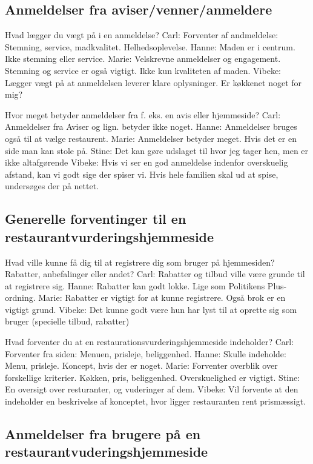 \documentclass[a4paper, 12pt]{article}
\begin{document}
\subsection{Anmeldelser fra aviser/venner/anmeldere}

  Hvad lægger du vægt på i en anmeldelse?
    Carl: Forventer af andmeldelse: Stemning, service, madkvalitet. Helhedsoplevelse.
    Hanne: Maden er i centrum. Ikke stemning eller service.
    Marie: Velskrevne anmeldelser og engagement. 
	   Stemning og service er også vigtigt. Ikke kun kvaliteten af maden.
    Vibeke: Lægger vægt på at anmeldelsen leverer klare oplysninger. Er køkkenet noget for
	    mig?

  Hvor meget betyder anmeldelser fra f. eks. en avis eller hjemmeside?
    Carl: Anmeldelser fra Aviser og lign. betyder ikke noget.
    Hanne: Anmeldelser bruges også til at vælge restaurent.
    Marie: Anmeldelser betyder meget. Hvis det er en side man kan stole på.
    Stine: Det kan gøre udslaget til hvor jeg tager hen, men er ikke altafgørende
    Vibeke: Hvis vi ser en god anmeldelse indenfor overskuelig afstand, kan vi godt sige der
	    spiser vi. Hvis hele familien skal ud at spise, undersøges der på nettet.

\subsection{Generelle forventinger til en restaurantvurderingshjemmeside}

  Hvad ville kunne få dig til at registrere dig som bruger på hjemmesiden?
  Rabatter, anbefalinger eller andet?
    Carl: Rabatter og tilbud ville være grunde til at registrere sig.
    Hanne: Rabatter kan godt lokke. Lige som Politikens Plus-ordning.
    Marie: Rabatter er vigtigt for at kunne registrere. Også brok er en vigtigt grund.
    Vibeke: Det kunne godt være hun har lyst til at oprette sig som bruger (specielle
	    tilbud, rabatter)

  Hvad forventer du at en restaurationsvurderingshjemmeside indeholder?
    Carl: Forventer fra siden: Menuen, prisleje, beliggenhed.
    Hanne: Skulle indeholde: Menu, prisleje. Koncept, hvis der er noget.
    Marie: Forventer overblik over forskellige kriterier. Køkken, pris, beliggenhed.
	   Overskuelighed er vigtigt.
    Stine: En oversigt over resturanter, og vuderinger af dem.
    Vibeke: Vil forvente at den indeholder en beskrivelse af konceptet, hvor ligger
	    restauranten rent prismæssigt.

\subsection{Anmeldelser fra brugere på en restaurantvuderingshjemmeside}
\end{document}
